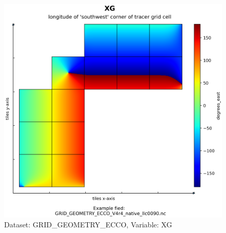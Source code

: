 \begin{figure}[H]
\centering
\includegraphics[scale=0.55]{../images/plots/native_plots_coords/Geometry_Parameters_for_the_Lat-Lon-Cap_90_(llc90)_Native_Model_Grid_(Version_4_Release_4)/XG.png}
\caption{Dataset: GRID\_GEOMETRY\_ECCO, Variable: XG}
\label{tab:table-GRID_GEOMETRY_ECCO_XG-Plot}
\end{figure}
\pagebreak
